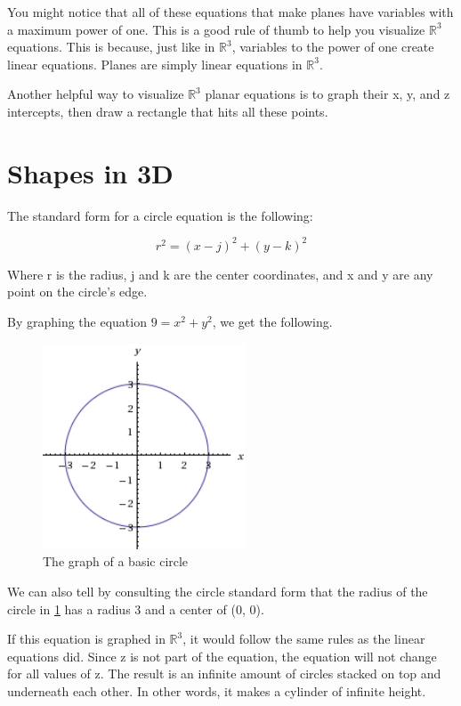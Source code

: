 \documentclass{article}
\begin{document}
You might notice that all of these equations that make planes have variables
with a maximum power of one. This is a good rule of thumb to help you visualize
$\mathbb{R}^3$ equations. This is because, just like in $\mathbb{R}^3$,
variables to the power of one create linear equations. Planes are simply linear
equations in $\mathbb{R}^3$.

Another helpful way to visualize $\mathbb{R}^3$ planar equations is to graph
their x, y, and z intercepts, then draw a rectangle that hits all these
points.

\section{Shapes in 3D}
The standard form for a circle equation is the following:

$$r^2 = (x - j)^2 + (y - k)^2$$

Where r is the radius, j and k are the center coordinates, and x and y are any
point on the circle's edge.

By graphing the equation $9 = x^2 + y^2$, we get the following.

\begin{figure}[H]
	\centering
	\includegraphics[width=6cm]{circle-radius-3}
	\caption{The graph of a basic circle}
	\label{fig:circle}
\end{figure}

We can also tell by consulting the circle standard form that the radius of the
circle in \ref{fig:circle} has a radius 3 and a center of (0, 0).

If this equation is graphed in $\mathbb{R}^3$, it would follow the same rules
as the linear equations did. Since z is not part of the equation, the equation
will not change for all values of z. The result is an infinite amount of
circles stacked on top and underneath each other. In other words, it makes a
cylinder of infinite height.
\end{document}
